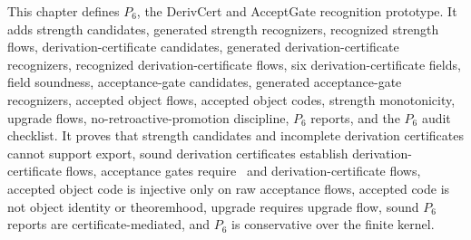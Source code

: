 \begin{remark}[Summary]
\label{rem:deriv-accept-summary}
This chapter defines $P_6$, the DerivCert and AcceptGate recognition prototype. It adds strength candidates, generated strength recognizers, recognized strength flows, derivation-certificate candidates, generated derivation-certificate recognizers, recognized derivation-certificate flows, six derivation-certificate fields, field soundness, acceptance-gate candidates, generated acceptance-gate recognizers, accepted object flows, accepted object codes, strength monotonicity, upgrade flows, no-retroactive-promotion discipline, $P_6$ reports, and the $P_6$ audit checklist. It proves that strength candidates and incomplete derivation certificates cannot support export, sound derivation certificates establish derivation-certificate flows, acceptance gates require \NameCert\ and derivation-certificate flows, accepted object code is injective only on raw acceptance flows, accepted code is not object identity or theoremhood, upgrade requires upgrade flow, sound $P_6$ reports are certificate-mediated, and $P_6$ is conservative over the finite kernel.
\end{remark}
